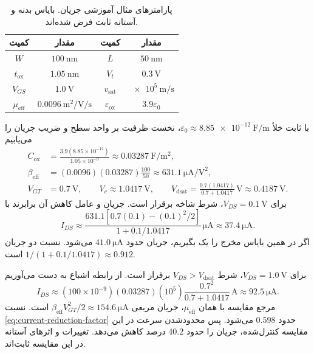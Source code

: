 \begin{table}[!htbp]
\centering
\caption{پارامترهای مثال آموزشی جریان. بایاس بدنه و آستانه ثابت فرض شده‌اند.}
\label{tab:high-field-data}
\begin{tabular}{cc@{\qquad}cc}
\toprule
کمیت & مقدار & کمیت & مقدار\\
\midrule
\(W\) & \(\qty{100}{\nano\metre}\) & \(L\) & \(\qty{50}{\nano\metre}\)\\
\(t_{\mathrm{ox}}\) & \(\qty{1.05}{\nano\metre}\) & \(V_t\) & \(\qty{0.3}{\volt}\)\\
\(V_{GS}\) & \(\qty{1.0}{\volt}\) & \(v_{\mathrm{sat}}\) & \(\qty{e5}{\metre\per\second}\)\\
\(\mu_{\mathrm{eff}}\) & \(\qty{0.0096}{\metre\squared\per\volt\per\second}\) & \(\varepsilon_{\mathrm{ox}}\) & \(3.9\varepsilon_0\)\\
\bottomrule
\end{tabular}
\end{table}

با ثابت  خلأ
\(\varepsilon_0\approx\qty{8.85e-12}{\farad\per\metre}\)، نخست
ظرفیت بر واحد سطح و ضریب جریان را می‌یابیم
\begin{align*}
 C_{\mathrm{ox}}&=\frac{3.9(8.85\times10^{-12})}{1.05\times10^{-9}}
 \approx\qty{0.03287}{\farad\per\metre\squared},\\
 \beta_{\mathrm{eff}}&=(0.0096)(0.03287)\frac{100}{50}
 \approx\qty{631.1}{\micro\ampere\per\volt\squared},\\
 V_{GT}&=\qty{0.7}{\volt},\qquad
 V_c\approx\qty{1.0417}{\volt},\qquad
 V_{\mathrm{dsat}}=\frac{0.7(1.0417)}{0.7+1.0417}\,\unit{\volt}
 \approx\qty{0.4187}{\volt}.
\end{align*}
برای \(V_{DS}=\qty{0.1}{\volt}\)، شرط شاخه  برقرار است.
جریان و عامل کاهش آن برابرند با
\begin{equation*}
 I_{DS}\approx\frac{631.1[0.7(0.1)-(0.1)^2/2]}{1+0.1/1.0417}
 \,\unit{\micro\ampere}
 \approx\qty{37.4}{\micro\ampere}.
\end{equation*}
اگر در همین بایاس مخرج را یک بگیریم، جریان حدود
\(\qty{41.0}{\micro\ampere}\) می‌شود. نسبت دو جریان
\(1/(1+0.1/1.0417)\approx0.912\) است.

برای \(V_{DS}=\qty{1.0}{\volt}\)، شرط
\(V_{DS}>V_{\mathrm{dsat}}\) برقرار است. از رابطه اشباع به دست می‌آوریم
\begin{equation*}
 I_{DS}\approx(100\times10^{-9})(0.03287)(10^5)
 \frac{0.7^2}{0.7+1.0417}\,\unit{\ampere}
 \approx\qty{92.5}{\micro\ampere}.
\end{equation*}
مرجع مقایسه با همان \(\mu_{\mathrm{eff}}\)، جریان مربعی
\(\beta_{\mathrm{eff}}V_{GT}^2/2\approx\qty{154.6}{\micro\ampere}\)
است. نسبت \eqref{eq:current-reduction-factor} حدود \(0.598\) می‌شود.
پس محدودشدن سرعت در این مقایسه کنترل‌شده، جریان را حدود \num{40.2} درصد
کاهش می‌دهد. تغییرات  و اثرهای آستانه در این مقایسه ثابت‌اند.

